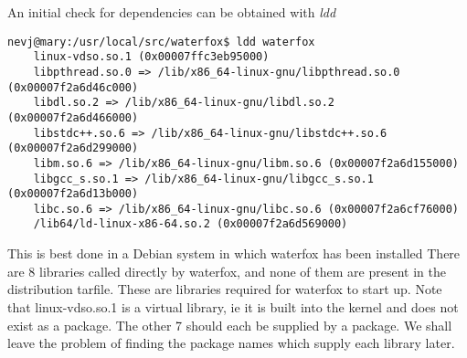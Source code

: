 \documentclass[a4paper]{article}  %
\begin{document}
An initial check for dependencies can be obtained with {\em ldd}
\begin{tcolorbox}
\begin{verbatim}
nevj@mary:/usr/local/src/waterfox$ ldd waterfox
	linux-vdso.so.1 (0x00007ffc3eb95000)
	libpthread.so.0 => /lib/x86_64-linux-gnu/libpthread.so.0 (0x00007f2a6d46c000)
	libdl.so.2 => /lib/x86_64-linux-gnu/libdl.so.2 (0x00007f2a6d466000)
	libstdc++.so.6 => /lib/x86_64-linux-gnu/libstdc++.so.6 (0x00007f2a6d299000)
	libm.so.6 => /lib/x86_64-linux-gnu/libm.so.6 (0x00007f2a6d155000)
	libgcc_s.so.1 => /lib/x86_64-linux-gnu/libgcc_s.so.1 (0x00007f2a6d13b000)
	libc.so.6 => /lib/x86_64-linux-gnu/libc.so.6 (0x00007f2a6cf76000)
	/lib64/ld-linux-x86-64.so.2 (0x00007f2a6d569000)
\end{verbatim}
\end{tcolorbox}
This is best done in a Debian system in which waterfox has been installed
There are 8 libraries called directly by waterfox, and none of them are present in the distribution tarfile. These are libraries required for waterfox to start up. Note that linux-vdso.so.1 is a virtual library, ie it is built into the kernel and does not exist as a package. The other 7 should each be supplied by a package. We shall leave the problem of finding the package names which supply each library later.
\end{document}

